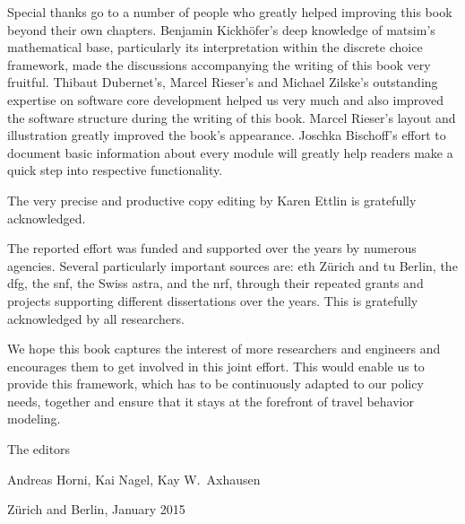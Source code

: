 Special thanks go to a number of people who greatly helped improving this book beyond their own chapters.
Benjamin Kickhöfer's deep knowledge of \gls{matsim}'s mathematical base, particularly its interpretation within the discrete choice framework, made the discussions accompanying the writing of this book very fruitful. 
Thibaut Dubernet's, Marcel Rieser's and Michael Zilske's outstanding expertise on software core development helped us very much and also improved the software structure during the writing of this book.
Marcel Rieser's layout and illustration greatly improved the book's appearance.
Joschka Bischoff's effort to document basic information about every module will greatly help readers make a quick step into respective functionality.

The very precise and productive copy editing by Karen Ettlin is gratefully acknowledged. %

The reported effort was funded and supported over the years by numerous agencies. Several particularly important sources are: \gls{eth} Zürich and \gls{tu} Berlin,
the \gls{dfg}, the \gls{snf}, the Swiss \gls{astra}, 
and the \gls{nrf}, through their repeated grants and projects supporting different dissertations over the years. This is gratefully acknowledged by all researchers. 


We hope this book captures the interest of more researchers and engineers and encourages them to get involved in this joint effort. This would enable us to provide this \gls{framework}, which has to be continuously adapted to our policy needs, together and ensure that it stays at the forefront of travel behavior modeling.

The editors

Andreas Horni, 	Kai Nagel,	Kay W.\ Axhausen


Zürich and Berlin, January 2015

%

